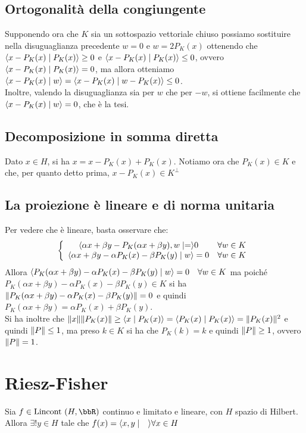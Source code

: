 \documentclass[a4paper,NoNotes,GeneralMath]{stdmdoc}
\newcommand{\Lincont}{\text{Lincont }}
\begin{document}
	\subsection*{Ortogonalità della congiungente}
	Supponendo ora che $K$ sia un sottospazio vettoriale chiuso possiamo sostituire nella disuguaglianza precedente $w = 0$ e $w = 2 P_K(x)$ ottenendo che $\langle x - P_K(x) \mid P_K(x) \rangle \ge 0$ e $\langle x - P_K(x) \mid P_K(x) \rangle \le 0$, ovvero $\langle x - P_K(x) \mid P_K(x) \rangle = 0$, ma allora otteniamo $\langle x - P_K(x) \mid w \rangle = \langle x - P_K(x) \mid w - P_K(x) \rangle \le 0$. \\
	Inoltre, valendo la disuguaglianza sia per $w$ che per $-w$, si ottiene facilmente che $\langle x - P_K(x) \mid w \rangle = 0$, che è la tesi.
	
	\subsection*{Decomposizione in somma diretta}
	Dato $x \in H$, si ha $x = x - P_K(x) + P_K(x)$. Notiamo ora che $P_K(x) \in K$ e che, per quanto detto prima, $x - P_K(x) \in K^\bot$
	
	\subsection*{La proiezione è lineare e di norma unitaria}
	Per vedere che è lineare, basta osservare che:
	$$ \left\{ \begin{array}{cc} \langle \alpha x + \beta y - P_K(\alpha x + \beta y), w \mid = \rangle 0 & \forall w \in K \\
	\langle \alpha x + \beta y - \alpha P_K(x) - \beta P_K(y) \mid w \rangle = 0 & \forall w \in K \\ \end{array} \right. $$
	Allora $\langle P_K(\alpha x + \beta y) - \alpha P_K(x) - \beta P_K(y) \mid w \rangle = 0 \quad \forall w \in K$ ma poiché $P_K(\alpha x + \beta y) - \alpha P_K(x) - \beta P_K(y) \in K$ si ha $\| {P_K(\alpha x + \beta y) - \alpha P_K(x) - \beta P_K(y)} \| = 0$ e quindi $P_K(\alpha x + \beta y) = \alpha P_K(x) + \beta P_K(y)$. \\
	Si ha inoltre che $\| {x} \| \| {P_K(x)} \| \ge \langle x \mid P_K(x) \rangle = \langle P_K(x) \mid P_K(x) \rangle = \| {P_K(x)} \|^2$ e quindi $\| {P} \| \le 1$, ma preso $k \in K$ si ha che $P_K(k) = k$ e quindi $\| {P} \| \ge 1$, ovvero $\| {P} \| = 1$.
	
	\section*{Riesz-Fisher}
	Sia $f \in \Lincont(H, \bbR)$ continuo e limitato e lineare, con $H$ spazio di Hilbert. Allora $\exists ! y \in H$ tale che $f(x) = \langle x, y \mid \quad \rangle \forall x \in H$ \\
	
\end{document}
